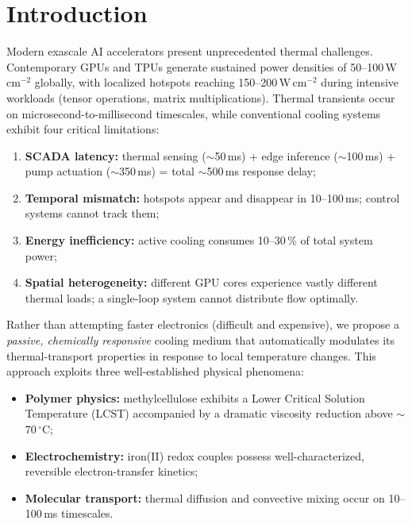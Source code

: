 \documentclass[11pt,a4paper]{article}
\begin{document}
\section{Introduction}
Modern exascale AI accelerators present unprecedented thermal challenges. Contemporary GPUs and TPUs generate sustained power densities of 50--100\,W\,cm$^{-2}$ globally, with localized hotspots reaching 150--200\,W\,cm$^{-2}$ during intensive workloads (tensor operations, matrix multiplications). Thermal transients occur on microsecond-to-millisecond timescales, while conventional cooling systems exhibit four critical limitations:

\begin{enumerate}[leftmargin=1.5em]
    \item \textbf{SCADA latency:} thermal sensing ($\sim$50\,ms) + edge inference ($\sim$100\,ms) + pump actuation ($\sim$350\,ms) = total $\sim$500\,ms response delay;
    \item \textbf{Temporal mismatch:} hotspots appear and disappear in 10--100\,ms; control systems cannot track them;
    \item \textbf{Energy inefficiency:} active cooling consumes 10--30\,\% of total system power;
    \item \textbf{Spatial heterogeneity:} different GPU cores experience vastly different thermal loads; a single-loop system cannot distribute flow optimally.
\end{enumerate}

Rather than attempting faster electronics (difficult and expensive), we propose a \textit{passive, chemically responsive} cooling medium that automatically modulates its thermal-transport properties in response to local temperature changes. This approach exploits three well-established physical phenomena:

\begin{itemize}[leftmargin=1.5em]
    \item \textbf{Polymer physics:} methylcellulose exhibits a Lower Critical Solution Temperature (LCST) accompanied by a dramatic viscosity reduction above $\sim$70\,$^\circ$C;
    \item \textbf{Electrochemistry:} iron(II) redox couples possess well-characterized, reversible electron-transfer kinetics;
    \item \textbf{Molecular transport:} thermal diffusion and convective mixing occur on 10--100\,ms timescales.
\end{itemize}
\end{document}
